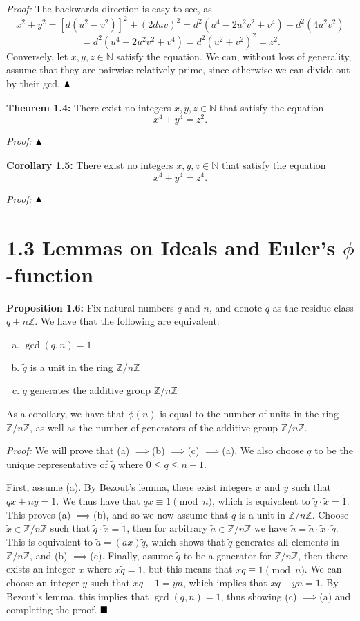 \documentclass[12pt]{article}
\newcommand{\N}{\ensuremath{\mathbb{N}}}
\newcommand{\Z}{\ensuremath{\mathbb{Z}}}
\newcommand{\proof}{\textit{Proof: }}
\newcommand{\partialdone}{\ensuremath{\strut\hfill\blacktriangle}}
\newcommand{\done}{\ensuremath{\strut\hfill\blacksquare}}
\newcommand{\impl}{\ensuremath{\implies}}
\begin{document}
\proof
The backwards direction is easy to see, as
\[
	x^2 + y^2
	= [d(u^2 - v^2)]^2 + (2duv)^2
	= d^2(u^4 - 2u^2v^2 + v^4) + d^2(4u^2v^2)
\]
\[
	= d^2(u^4 + 2u^2v^2 + v^4)
	= d^2(u^2 + v^2)^2
	= z^2.
\]
Conversely, let \( x, y, z \in \N \) satisfy the equation.
We can, without loss of generality, assume that they are pairwise relatively
prime, since otherwise we can divide out by their gcd.
\partialdone

\textbf{Theorem 1.4:}
There exist no integers \( x, y, z \in \N \) that satisfy the equation
\[
	x^4 + y^4 = z^2.
\]

\proof
\partialdone

\textbf{Corollary 1.5:}
There exist no integers \( x, y, z \in \N \) that satisfy the equation
\[
	x^4 + y^4 = z^4.
\]

\proof
\partialdone

\section*{1.3 Lemmas on Ideals and Euler's \( \phi \)-function}

\textbf{Proposition 1.6:}
Fix natural numbers \( q \) and \( n \), and denote \( \tilde{q} \) as the
residue class \( q + n\Z \).
We have that the following are equivalent:
\begin{enumerate}[(a)]
	\item \( \gcd(q,n) = 1 \)

	\item \( \tilde{q} \) is a unit in the ring \( \Z/n\Z \)

	\item \( \tilde{q} \) generates the additive group \( \Z/n\Z \)
\end{enumerate}
As a corollary, we have that \( \phi(n) \) is equal to the number of units
in the ring \( \Z/n\Z \), as well as the number of generators of the additive
group \( \Z/n\Z \).

\proof
We will prove that (a) \impl (b) \impl (c) \impl (a).
We also choose \( q \) to be the unique representative of \( \tilde{q} \)
where \( 0 \leq q \leq n - 1 \).

First, assume (a).
By Bezout's lemma, there exist integers \( x \) and \( y \) such that
\( qx + ny = 1 \).
We thus have that \( qx \equiv 1 \pmod{n} \), which is equivalent to
\( \tilde{q} \cdot \tilde{x} = \tilde{1} \).
This proves (a) \impl (b), and so we now assume that \( \tilde{q} \) is a unit
in \( \Z/n\Z \).
Choose \( \tilde{x} \in \Z/n\Z \) such that
\( \tilde{q} \cdot \tilde{x} = \tilde{1} \), then for arbitrary
\( \tilde{a} \in \Z/n\Z \) we have
\( \tilde{a} = \tilde{a} \cdot \tilde{x} \cdot \tilde{q} \).
This is equivalent to \( \tilde{a} = (ax)\tilde{q} \), which shows that
\( \tilde{q} \) generates all elements in \( \Z/n\Z \), and (b) \impl (c).
Finally, assume \( \tilde{q} \) to be a generator for \( \Z/n\Z \), then
there exists an integer \( x \) where \( x\tilde{q} = \tilde{1} \), but this
means that \( xq \equiv 1 \pmod{n} \).
We can choose an integer \( y \) such that \( xq - 1 = yn \), which implies
that \( xq - yn = 1 \).
By Bezout's lemma, this implies that \( \gcd(q,n) = 1 \), thus showing
(c) \impl (a) and completing the proof.
\done
\end{document}
